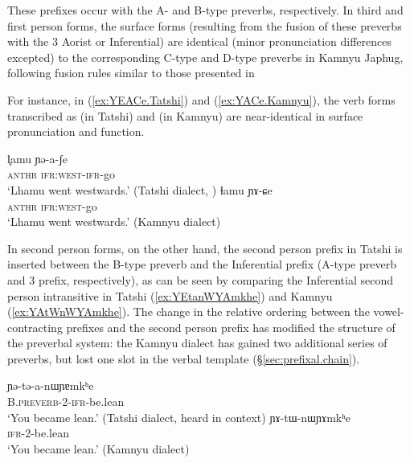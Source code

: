 These prefixes occur with the A- and B-type preverbs, respectively. In third and first person forms, the surface forms (resulting from the fusion of these preverbs with the  3\flobv{} Aorist or Inferential) are identical (minor pronunciation differences excepted) to the corresponding C-type and D-type preverbs in Kamnyu Japhug,  following fusion rules similar to those presented in 

For instance, in (\ref{ex:YEACe.Tatshi}) and (\ref{ex:YACe.Kamnyu}), the verb forms transcribed as  (in Tatshi) and  (in Kamnyu) are near-identical in surface pronunciation and function.

 \begin{exe}
 \ex 
 \begin{xlist}
 \ex \label{ex:YEACe.Tatshi}
 \gll l̥amu ɲə-a-ʃe \\
  \textsc{anthr} \textsc{ifr}:\textsc{west}-\textsc{ifr}-go \\
 \glt `Lhamu went westwards.' (Tatshi dialect, \citealt[70]{lin11direction})
  \ex \label{ex:YACe.Kamnyu}
 \gll ɬamu ɲɤ-ɕe \\
  \textsc{anthr} \textsc{ifr}:\textsc{west}-go \\
 \glt `Lhamu went westwards.' (Kamnyu dialect)
 \end{xlist}
 \end{exe}

In second person forms, on the other hand, the second person prefix in Tatshi is inserted between the B-type preverb and the  Inferential prefix (A-type preverb and  3\flobv{} prefix, respectively), as can be seen by comparing the Inferential second person intransitive in Tatshi (\ref{ex:YEtanWYAmkhe}) and Kamnyu (\ref{ex:YAtWnWYAmkhe}). The change in the relative ordering between the vowel-contracting prefixes and the second person prefix has modified the structure of the preverbal system: the Kamnyu dialect has gained two additional series of preverbs, but lost one slot in the verbal template (§\ref{sec:prefixal.chain}).  

 \begin{exe}
 \ex 
 \begin{xlist}
 \ex \label{ex:YEtanWYAmkhe}
 \gll   ɲə-tə-a-nɯɲɐmkʰe \\
B.\textsc{preverb}-2-\textsc{ifr}-be.lean \\
 \glt `You became lean.' (Tatshi dialect, heard in context)
  \ex \label{ex:YAtWnWYAmkhe}
 \gll   ɲɤ-tɯ-nɯɲɤmkʰe \\
\textsc{ifr}-2-be.lean \\
 \glt `You became lean.' (Kamnyu dialect)
 \end{xlist}
 \end{exe}

